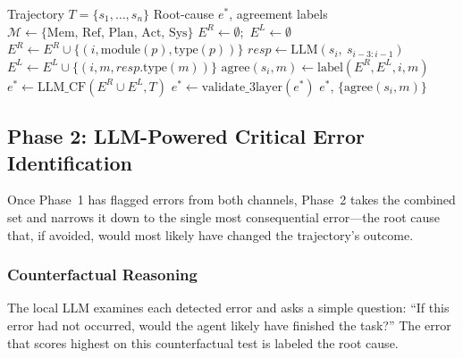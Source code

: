 \documentclass{ieeeaccess}
\begin{document}
\begin{algorithm}[h!]
\caption{AgentDebug Dual-Channel Pipeline}
\label{alg:pipeline}
\begin{algorithmic}[1]
\REQUIRE Trajectory $T = \{s_1, \ldots, s_n\}$
\ENSURE Root-cause $e^*$, agreement labels
\STATE $\mathcal{M} \leftarrow \{\text{Mem, Ref, Plan, Act, Sys}\}$
\STATE $E^R \leftarrow \emptyset$;\ $E^L \leftarrow \emptyset$
    \STATE {}
            \STATE $E^R \leftarrow E^R \cup \{(i, \text{module}(p), \text{type}(p))\}$
        \ENDIF
    \ENDFOR
    \STATE {}
    \STATE $\textit{resp} \leftarrow \text{LLM}(s_i,\ s_{i-3:i-1})$ 
            \STATE $E^L \leftarrow E^L \cup \{(i, m, \textit{resp}.\text{type}(m))\}$
        \ENDIF
    \ENDFOR
    \STATE {}
        \STATE $\text{agree}(s_i, m) \leftarrow \text{label}(E^R, E^L, i, m)$ 
    \ENDFOR
\ENDFOR
\STATE {}
\STATE $e^* \!\leftarrow\! \text{LLM\_CF}(E^R \!\cup\! E^L, T)$
\STATE $e^* \!\leftarrow\! \text{validate\_3layer}(e^*)$
\RETURN $e^*$, $\{\text{agree}(s_i, m)\}$
\end{algorithmic}
\end{algorithm}

\subsection{Phase 2: LLM-Powered Critical Error Identification}

Once Phase~1 has flagged errors from both channels, Phase~2 takes the combined set and narrows it down to the single most consequential error---the root cause that, if avoided, would most likely have changed the trajectory's outcome.

\subsubsection{Counterfactual Reasoning}

The local LLM examines each detected error and asks a simple question: ``If this error had not occurred, would the agent likely have finished the task?'' The error that scores highest on this counterfactual test is labeled the root cause.
\end{document}

